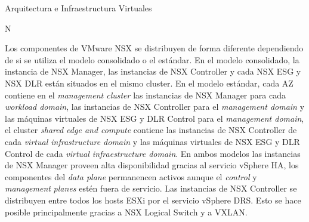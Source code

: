 \begin{subsection}{Arquitectura e Infraestructura Virtuales\cite{CFVirtInfraes}}

N

Los componentes de VMware NSX se distribuyen de forma diferente dependiendo de si se utiliza el modelo consolidado o el estándar. En el modelo consolidado, la instancia de NSX Manager, las instancias de NSX Controller y cada NSX ESG y NSX DLR están situados en el mismo cluster. En el modelo estándar, cada AZ contiene en el \textit{management cluster} las instancias de NSX Manager para cada \textit{workload domain}, las instancias de NSX Controller para el \textit{management domain} y las máquinas virtuales de NSX ESG y DLR Control para el \textit{management domain}, el cluster \textit{shared edge and compute} contiene las instancias de NSX Controller de cada \textit{virtual infrastructure domain} y las máquinas virtuales de NSX ESG y DLR Control de cada \textit{virtual infraestructure domain}. En ambos modelos las instancias de NSX Manager proveen alta disponibilidad gracias al servicio vSphere HA, los componentes del \textit{data plane} permanencen activos aunque el \textit{control} y \textit{management} \textit{planes} estén fuera de servicio. Las instancias de NSX Controller se distribuyen entre todos los hosts ESXi por el servicio vSphere DRS.
 Esto se hace posible principalmente gracias a NSX Logical Switch y a VXLAN.\\





\end{subsection}
